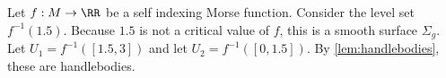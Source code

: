 

    Let $f: M\to \RR$ be a self indexing Morse function. Consider the level set $f^{-1}(1.5)$. Because $1.5$ is not a critical value of $f$, this is a smooth surface $\Sigma_g$. Let $U_1=f^{-1}([1.5, 3])$ and let $U_2=f^{-1}([0, 1.5])$. By \cref{lem:handlebodies}, these are handlebodies.
